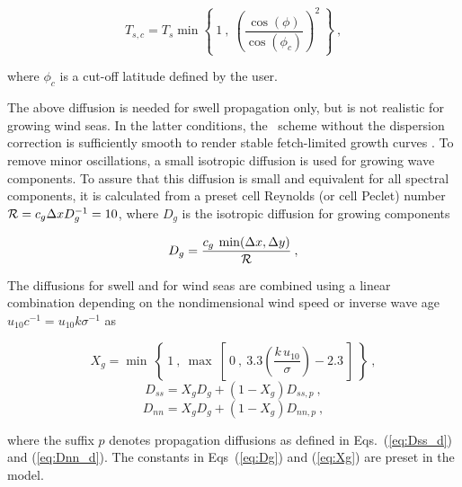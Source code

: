 
\begin{equation}
T_{s,c} = T_s \min \left \{ \: 1 \: , \: 
\left ( \frac{\cos(\phi)}{\cos(\phi_c)} \right )^2 \: \right \}
\: , \label{eq:Ts_cor} \end{equation}

\noindent
where $\phi_c$ is a cut-off latitude defined by the user.

\vspace{\baselineskip} \noindent 
The above diffusion is needed for swell propagation only, but is not realistic
for growing wind seas. In the latter conditions, the \uq\ scheme without the
dispersion correction is sufficiently smooth to render stable fetch-limited
growth curves \citep{tol:OMB95}. To remove minor oscillations, a small
isotropic diffusion is used for growing wave components. To assure that this
diffusion is small and equivalent for all spectral components, it is
calculated from a preset cell Reynolds (or cell Peclet) number ${\cal R} = c_g
\Delta x D_g^{-1} = 10$, where $D_g$ is the isotropic diffusion for growing
components


\begin{equation}
D_g = \frac{c_g \: \min(\Delta x , \Delta y)}{{\cal R}} \: , \label{eq:Dg}
 \end{equation}

\noindent
The diffusions for swell and for wind seas are combined using a linear
combination depending on the nondimensional wind speed or inverse wave age
$u_{10} c^{-1} = u_{10} k \sigma^{-1}$ as


\begin{equation}
X_g = \min \: \left \{ \: 1 \: , \: \max \: \left [ \: 0 \: , \:
3.3 \left ( \frac{k \, u_{10}}{\sigma} \right ) - 2.3
\: \right ] \: \right \}
 \: , \label{eq:Xg} \end{equation} \begin{equation}
D_{ss} = X_g D_g + (1-X_g) D_{ss,p}
\: , \label{eq:Dss_f} \end{equation} \begin{equation}
D_{nn} = X_g D_g + (1-X_g) D_{nn,p}
\: , \label{eq:Dnn_f} \end{equation}

\noindent
where the suffix $p$ denotes propagation diffusions as defined in
Eqs.~(\ref{eq:Dss_d}) and (\ref{eq:Dnn_d}). The constants in Eqs~(\ref{eq:Dg})
and (\ref{eq:Xg}) are preset in the model.

